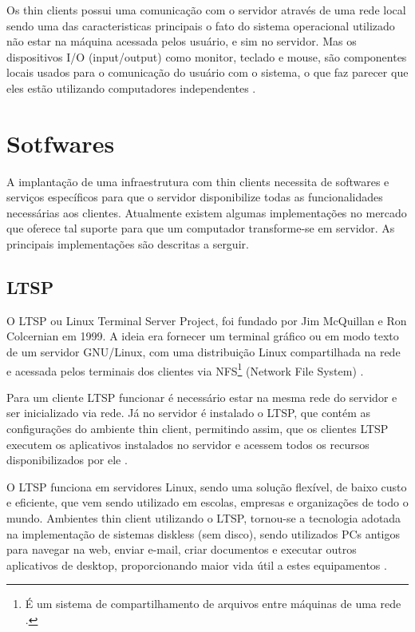 \documentclass[
	12pt,				%
	openright,			%
	twoside,			%
	a4paper,			%
	chapter=TITLE,		%
	english,			%
	brazil				%
	]{abntex2}
\begin{document}
Os thin clients possui uma comunicação com o servidor através de uma rede local sendo uma das caracteristicas principais o fato do sistema operacional utilizado não estar na máquina acessada pelos usuário, e sim no servidor. Mas os dispositivos I/O (input/output) como monitor, teclado e mouse, são componentes locais usados para o comunicação do usuário com o sistema, o que faz parecer que eles estão utilizando computadores independentes \cite{richards2007linux, ComoFuncionaThinClient}.


\section{Sotfwares}

A implantação de uma infraestrutura com thin clients necessita de softwares e serviços específicos para que o servidor disponibilize todas as funcionalidades necessárias aos clientes. Atualmente existem algumas implementações no mercado que oferece tal suporte para que um computador transforme-se em servidor. As principais implementações são descritas a serguir.


\subsection{LTSP}

O LTSP ou Linux Terminal Server Project, foi fundado por Jim McQuillan e Ron Colcernian em 1999. A ideia era fornecer um terminal gráfico ou em modo texto de um servidor GNU/Linux, com uma distribuição Linux compartilhada na rede e acessada pelos terminais dos clientes via NFS\footnote{É um sistema de compartilhamento de arquivos entre máquinas de uma rede \cite{nfs}.} (Network File System) \cite{piaui}. 

Para um cliente LTSP funcionar é necessário estar na mesma rede do servidor e ser inicializado via rede.  Já no servidor é instalado o LTSP, que contém as configurações do ambiente thin client, permitindo assim, que os clientes LTSP executem os aplicativos instalados no servidor e acessem todos os recursos disponibilizados por ele \cite{piaui}.

O LTSP funciona em servidores Linux, sendo uma solução flexível, de baixo custo e eficiente, que vem sendo utilizado em escolas, empresas e organizações de todo o mundo. Ambientes thin client utilizando o LTSP, tornou-se a tecnologia adotada na implementação de sistemas diskless (sem disco), sendo utilizados PCs antigos para navegar na web, enviar e-mail, criar documentos e executar outros aplicativos de desktop, proporcionando maior vida útil a estes equipamentos \cite{piaui,ltsp}.
\end{document}
